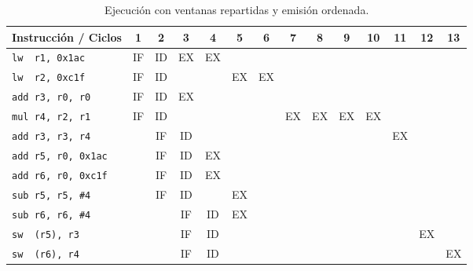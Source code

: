 \begin{ejercicio}
\begin{table}[H]
\centering
\scriptsize
\begin{tabular}{|l|c|c|c|c|c|c|c|c|c|c|c|c|c|}
    \hline
    Instrucción / Ciclos & 1 & 2 & 3 & 4 & 5 & 6 & 7 & 8 & 9 & 10 & 11 & 12 & 13 \\
    \hline
    \verb|lw  r1, 0x1ac|     & IF & ID & EX & EX & & & & & & & & & \\
    \hline        
    \verb|lw  r2, 0xc1f|     & IF & ID & & & EX & EX & & & & & & & \\
    \hline           
    \verb|add r3, r0, r0|    & IF & ID & EX & & & & & & & & & & \\
    \hline                        
    \verb|mul r4, r2, r1|    & IF & ID & & & & & EX & EX & EX & EX & & & \\
    \hline            
    \verb|add r3, r3, r4|    & & IF & ID & & & & & & & & EX & & \\
    \hline
    \verb|add r5, r0, 0x1ac| & & IF & ID & EX & & & & & & & & & \\
    \hline
    \verb|add r6, r0, 0xc1f| & & IF & ID & EX & & & & & & & & & \\
    \hline
    \verb|sub r5, r5, #4|    & & IF & ID & & EX & & & & & & & & \\
    \hline            
    \verb|sub r6, r6, #4|    & & & IF & ID & EX & & & & & & & & \\
    \hline
    \verb|sw  (r5), r3|      & & & IF & ID & & & & & & & & EX & \\
    \hline
    \verb|sw  (r6), r4|      & & & IF & ID & & & & & & & & & EX \\
    \hline
\end{tabular}
\caption{Ejecución con ventanas repartidas y emisión ordenada.}
\end{table}

\end{ejercicio}

